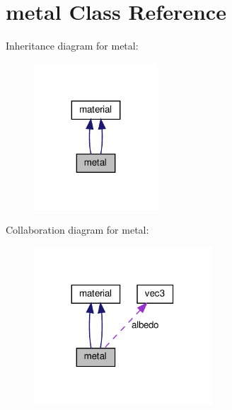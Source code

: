 \hypertarget{classmetal}{}\section{metal Class Reference}
\label{classmetal}


Inheritance diagram for metal\+:
\nopagebreak
\begin{figure}[H]
\begin{center}
\leavevmode
\includegraphics[width=131pt]{classmetal__inherit__graph}
\end{center}
\end{figure}


Collaboration diagram for metal\+:
\nopagebreak
\begin{figure}[H]
\begin{center}
\leavevmode
\includegraphics[width=188pt]{classmetal__coll__graph}
\end{center}
\end{figure}
